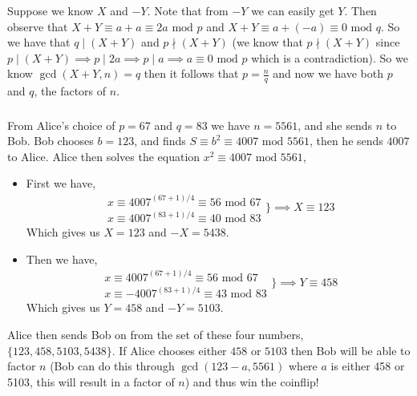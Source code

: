 \documentclass[class=article, crop=false]{standalone}
\begin{document}
\subsubsection{}
Suppose we know $X$ and $-Y$.  Note that from $-Y$ we can easily get $Y$.
  Then observe that $X+Y\equiv a+a\equiv 2a\mbox{ mod }p$ and $X+Y\equiv a+ (-a)\equiv 0\mbox{ mod }q$.
  So we have that $q\mid (X+Y)$ and $p\nmid (X+Y)$ (we know that $p\nmid (X+Y)$ since $p\mid(X+Y)\implies p\mid 2a\implies p\mid a\implies a\equiv 0\mbox{ mod }p$
  which is a contradiction). So we know $\gcd(X+Y, n)=q$ then it follows that $p = \frac{n}{q}$ and now we have
  both $p$ and $q$, the factors of $n$.
\subsubsection{}
From Alice's choice of $p=67$ and $q=83$ we have $n=5561$, and she sends $n$ to Bob.
  Bob chooses $b=123$, and finds $S\equiv b^2\equiv 4007\mbox{ mod }5561$, then he sends $4007$ to Alice.
  Alice then solves the equation $x^2\equiv 4007\mbox{ mod }5561$,
  \begin{itemize}
    \item First we have,
    $$\begin{array}{c}
      x\equiv 4007^{(67+1)/4}\equiv 56\mbox{ mod }67 \\
      x\equiv 4007^{(83+1)/4}\equiv 40\mbox{ mod }83
      \end{array}\Big\}\implies X\equiv 123$$
    Which gives us $X=123$ and $-X=5438$.
    \item Then we have,
    $$\begin{array}{c}
      x\equiv 4007^{(67+1)/4}\equiv 56\mbox{ mod }67 \\
      x\equiv -4007^{(83+1)/4}\equiv 43\mbox{ mod }83
    \end{array}\Big\}\implies Y\equiv 458$$
    Which gives us $Y=458$ and $-Y=5103$.
  \end{itemize}
  Alice then sends Bob on from the set of these four numbers, 
  $\{123, 458, 5103, 5438\}$. If Alice chooses either $458$ or $5103$
  then Bob will be able to factor $n$ (Bob can do this through $\gcd(123 - a, 5561)$ where $a$ is either
  458 or 5103, this will result in a factor of $n$) and thus win the coinflip!
\end{document}

